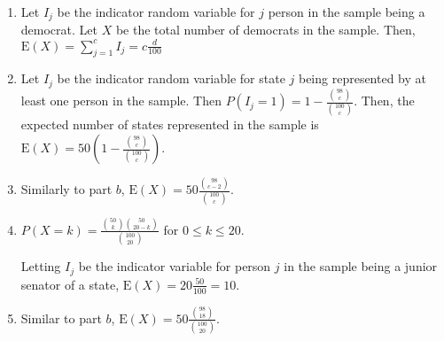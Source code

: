 \begin{enumerate}[label=(\alph*)]
\item Let $I_{j}$ be the indicator random variable for $j$ person in the sample
being a democrat. Let $X$ be the total number of democrats in the sample. Then,
$\text{E}(X) = \sum_{j=1}^{c}I_{j} = c\frac{d}{100}$

\item Let $I_{j}$ be the indicator random variable for state $j$ being
represented by at least one person in the sample. Then $P(I_{j} = 1) = 
1 - \frac{\binom{98}{c}}{\binom{100}{c}}$. Then, the expected number of states
represented in the sample is $\text{E}(X) = 50(1 - \frac{\binom{98}{c}}{
\binom{100}{c}})$.

\item Similarly to part $b$, $\text{E}(X) = 50\frac{\binom{98}{c-2}}{\binom{100}
{c}}$.

\item $P(X = k) = \frac{\binom{50}{k}\binom{50}{20-k}}{\binom{100}{20}}$ for $0
\leq k \leq 20$.

Letting $I_{j}$ be the indicator variable for person $j$ in the sample being a
junior senator of a state, $\text{E}(X) = 20\frac{50}{100} = 10$.

\item Similar to part $b$, $\text{E}(X) = 50\frac{\binom{98}{18}}{\binom{100}
{20}}$.

\end{enumerate}